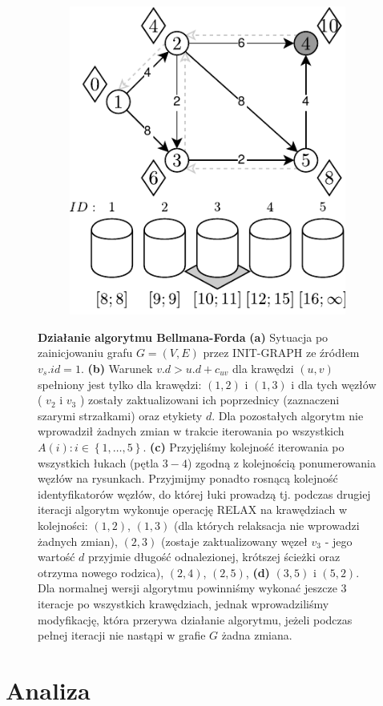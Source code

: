 \begin{figure}[!htbp]
\begin{subfigure}[b]{0.3\textwidth}
		\caption{}
	\end{subfigure}
	\begin{subfigure}[b]{0.3\textwidth}
		\includegraphics[width=\textwidth]{Chapter_II/8/f.pdf}
		\caption{}
	\end{subfigure}
	\caption{\textbf{Działanie algorytmu Bellmana-Forda} \textbf{(a)} Sytuacja po zainicjowaniu grafu $G = \left( V, E \right)$ przez \textsf{INIT-GRAPH} ze źródłem $v_{s}.id = 1$. \textbf{(b)} Warunek $ v.d > u.d + c_{uv} $ dla krawędzi $ \left( u, v \right) $ spełniony jest tylko dla krawędzi: $ \left( 1, 2 \right) $ i $ \left( 1, 3 \right) $ i dla tych węzłów ( $v_{2}$ i $v_{3}$ ) zostały zaktualizowani ich poprzednicy (zaznaczeni szarymi strzałkami) oraz etykiety $d$. Dla pozostałych algorytm nie wprowadził żadnych zmian w trakcie iterowania po wszystkich $ A \left( i \right) : i \in \left\{ 1, \ldots, 5\right\}$. \textbf{(c)} Przyjęliśmy kolejność iterowania po wszystkich łukach (pętla $3-4$) zgodną z kolejnością ponumerowania węzłów na rysunkach. Przyjmijmy ponadto rosnącą kolejność identyfikatorów węzłów, do której łuki prowadzą tj. podczas drugiej iteracji algorytm wykonuje operację \textsf{RELAX} na krawędziach w kolejności: $ \left( 1, 2 \right) $, $ \left( 1, 3 \right) $ (dla których relaksacja nie wprowadzi żadnych zmian), $ \left( 2, 3 \right) $ (zostaje zaktualizowany węzeł $v_{3}$ - jego wartość $d$ przyjmie długość odnalezionej, krótszej ścieżki oraz otrzyma nowego rodzica), $ \left( 2, 4 \right) $, $ \left( 2, 5 \right) $, \textbf{(d)} $ \left( 3, 5 \right) $ i $ \left( 5, 2 \right) $. Dla normalnej wersji algorytmu powinniśmy wykonać jeszcze 3 iteracje po wszystkich krawędziach, jednak wprowadziliśmy modyfikację, która przerywa działanie algorytmu, jeżeli podczas pełnej iteracji nie nastąpi w grafie $G$ żadna zmiana.} \label{fig:exampleBellmanFord}
\end{figure}

\section{Analiza}

